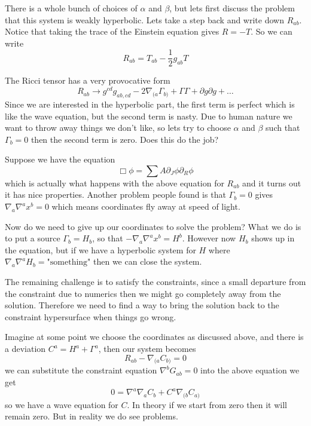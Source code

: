 \documentclass[letterpaper, 11pt]{article}
\numberwithin{equation}{section}
\numberwithin{figure}{section}
\begin{document}
There is a whole bunch of choices of $\alpha$ and $\beta$, but lets first
discuss the problem that this system is weakly hyperbolic. Lets take a step back
and write down $R_{ab}$. Notice that taking the trace of the Einstein equation
gives $R = -T$. So we can write 
\begin{equation}
  \label{eq:27}
  R_{ab} = T_{ab} - \frac{1}{2}g_{ab}T
\end{equation}

The Ricci tensor has a very provocative form
\begin{equation}
  \label{eq:28}
  R_{ab} \longrightarrow g^{cd}g_{ab,cd} - 2\nabla_{(a}\Gamma_{b)} + \Gamma\Gamma + \partial g \partial g + \dots
\end{equation}
Since we are interested in the hyperbolic part, the first term is perfect
which is like the wave equation, but the second term is nasty. Due to human
nature we want to throw away things we don't like, so lets try to choose
$\alpha$ and $\beta$ such that $\Gamma_{b} = 0$ then the second term is zero.
Does this do the job?

Suppose we have the equation
\begin{equation}
  \label{eq:29}
  \Box \phi = \sum A \partial_{J}\phi \partial_R\phi
\end{equation}
which is actually what happens with the above equation for $R_{ab}$ and it turns
out it has nice properties. Another problem people found is that $\Gamma_{b} =
0$ gives $\nabla_a\nabla^{a}x^{b} = 0$ which means coordinates fly away at speed
of light.

Now do we need to give up our coordinates to solve the problem? What we do is
to put a source $\Gamma_{b} = H_{b}$, so that $-\nabla_{a}\nabla^{a}x^{b} =
H^{b}$. However now $H_{b}$ shows up in the equation, but if we have a
hyperbolic system for $H$ where $\nabla_a\nabla^{a}H_{b} = \text{"something"}$
then we can close the system.

The remaining challenge is to satisfy the constraints, since a small departure
from the constraint due to numerics then we might go completely away from the
solution. Therefore we need to find a way to bring the solution back to the
constraint hypersurface when things go wrong.

Imagine at some point we choose the coordinates as discussed above, and there is
a deviation $C^{a} = H^{a} + \Gamma^{a}$, then our system becomes
\begin{equation}
  \label{eq:30}
  R_{ab} - \nabla_{(a}C_{b)} = 0
\end{equation}
we can substitute the constraint equation $\nabla^{b}G_{ab} = 0$ into the above
equation we get
\begin{equation}
  \label{eq:31}
  0 = \nabla^{a}\nabla_{a}C_{b} + C^{a}\nabla_{(b}C_{a)}
\end{equation}
so we have a wave equation for $C$. In theory if we start from zero then it will
remain zero. But in reality we do see problems.
\end{document}
